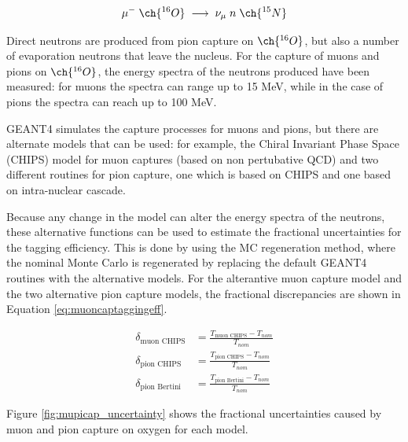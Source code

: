 \begin{equation}
        \mu^{-}\;\ch{^{16}{O}}\;\longrightarrow\;\nu_{\mu}\;n\;\ch{^{15}{N}}
\label{eq:muoncap}
\end{equation}

Direct neutrons are produced from pion capture on $\ch{^{16}O}$, but also a number of evaporation neutrons that leave the nucleus. For the capture of muons and pions on $\ch{^{16}O}$, the energy spectra of the neutrons produced have been measured: for muons the spectra can range up to 15 MeV, while in the case of pions the spectra can reach up to 100 MeV.


GEANT4 simulates the capture processes for muons and pions, but there are alternate models that can be used: for example, the Chiral Invariant Phase Space (CHIPS) model for muon captures (based on non pertubative QCD) and two different routines for pion capture, one which is based on CHIPS and one based on intra-nuclear cascade.

Because any change in the model can alter the energy spectra of the neutrons, these alternative functions can be used to estimate the fractional uncertainties for the tagging efficiency. This is done by using the MC regeneration method, where the nominal Monte Carlo is regenerated by replacing the default GEANT4 routines with the alternative models. For the alterantive muon capture model and the two alternative pion capture models, the fractional discrepancies are shown in Equation \ref{eq:muoncaptaggingeff}.

\begin{equation}
    \begin{aligned}
        \delta_{\text{muon CHIPS}} &=\frac{T_{\text{muon CHIPS}}-T_{n o m}}{T_{nom}} \\
        \delta_{\text{pion CHIPS}} &=\frac{T_{\text{pion CHIPS}}-T_{n o m}}{T_{nom}} \\
        \delta_{\text{pion Bertini}} &=\frac{T_{\text{pion Bertini}}-T_{n o m}}{T_{nom}}
        \end{aligned}
        \label{eq:muoncaptaggingeff}
\end{equation}

Figure \ref{fig:mupicap_uncertainty} shows the fractional uncertainties caused by muon and pion capture on oxygen for each model.


